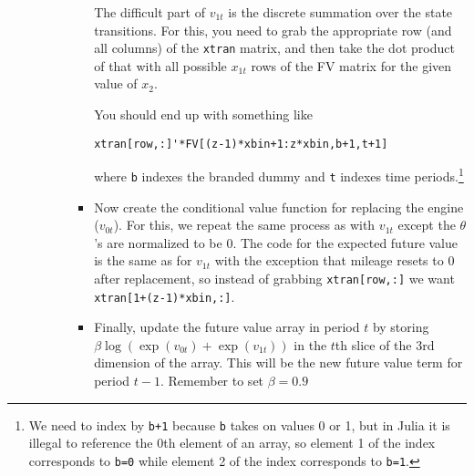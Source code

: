 \documentclass[12pt,english]{article}
\begin{document}
\begin{enumerate}
\begin{enumerate}
\begin{itemize}
\begin{itemize}
                \medskip
                
                The difficult part of $v_{1t}$ is the discrete summation over the state transitions. For this, you need to grab the appropriate row (and all columns) of the \texttt{xtran} matrix, and then take the dot product of that with all possible $x_{1t}$ rows of the FV matrix for the given value of $x_{2}$.
                
                You should end up with something like
                \begin{verbatim}
xtran[row,:]'*FV[(z-1)*xbin+1:z*xbin,b+1,t+1]
                \end{verbatim}
                where \texttt{b} indexes the branded dummy and \texttt{t} indexes time periods.\footnote{We need to index by \texttt{b+1} because \texttt{b} takes on values 0 or 1, but in Julia it is illegal to reference the 0th element of an array, so element 1 of the index corresponds to \texttt{b=0} while element 2 of the index corresponds to \texttt{b=1}.}
                \item Now create the conditional value function for replacing the engine ($v_{0t}$). For this, we repeat the same process as with $v_{1t}$ except the $\theta$'s are normalized to be 0. The code for the expected future value is the same as for $v_{1t}$ with the exception that mileage resets to 0 after replacement, so instead of grabbing \texttt{xtran[row,:]} we want \texttt{xtran[1+(z-1)*xbin,:]}.
                \item Finally, update the future value array in period $t$ by storing $\beta\log\left(\exp\left(v_{0t}\right)+\exp\left(v_{1t}\right)\right)$ in the $t$th slice of the 3rd dimension of the array. This will be the new future value term for period $t-1$. Remember to set $\beta=0.9$
            \end{itemize}
        \end{itemize}
        

\end{enumerate}
\end{enumerate}
\end{document}

